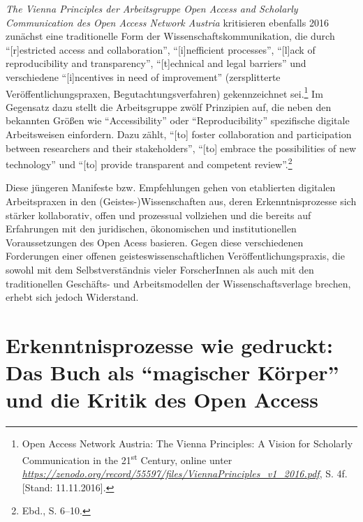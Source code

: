 \documentclass[a4paper,
fontsize=11pt,
oneside,
numbers=noperiodatend,
parskip=half-,
bibliography=totoc,
final
]{scrartcl}
\begin{document}
\emph{The Vienna Principles der Arbeitsgruppe Open Access and Scholarly
Communication des Open Access Network Austria} kritisieren ebenfalls
2016 zunächst eine traditionelle Form der Wissenschaftskommunikation,
die durch \enquote{{[}r{]}estricted access and collaboration},
\enquote{{[}i{]}nefficient processes}, \enquote{{[}l{]}ack of
reproducibility and transparency}, \enquote{{[}t{]}echnical and legal
barriers} und verschiedene \enquote{{[}i{]}n\-cent\-ives in need of
improvement} (zersplitterte Veröffentlichungspraxen,
Begutachtungsverfahren) gekennzeichnet sei.\footnote{Open Access Network
  Austria: The Vienna Principles: A Vision for Scholarly Communication
  in the 21\textsuperscript{st} Century, online unter
  \href{https://zenodo.org/record/55597/files/ViennaPrinciples_v1_2016.pdf}{\emph{https://zenodo.org/record/55597/files/ViennaPrinciples\_v1\_2016.pdf}},
  S. 4f. {[}Stand: 11.11.2016{]}.} Im Gegensatz dazu stellt die
Arbeitsgruppe zwölf Prinzipien auf, die neben den bekannten Größen wie
\enquote{Accessibility} oder \enquote{Reproducibility} spezifische
digitale Arbeitsweisen einfordern. Dazu zählt, \enquote{{[}to{]} foster
collaboration and participation between researchers and their
stakeholders}, \enquote{{[}to{]} embrace the possibilities of new
technology} und \enquote{{[}to{]} provide transparent and competent
review}.\footnote{Ebd., S. 6--10.}

Diese jüngeren Manifeste bzw. Empfehlungen gehen von etablierten
digitalen Arbeitspraxen in den (Geistes-)Wissenschaften aus, deren
Erkenntnisprozesse sich stärker kollaborativ, offen und prozessual
vollziehen und die bereits auf Erfahrungen mit den juridischen,
ökonomischen und institutionellen Voraussetzungen des Open Acess
basieren. Gegen diese verschiedenen Forderungen einer offenen
geisteswissenschaftlichen Veröffentlichungspraxis, die sowohl mit dem
Selbstverständnis vieler ForscherInnen als auch mit den traditionellen
Geschäfts- und Arbeitsmodellen der Wissenschaftsverlage brechen, erhebt
sich jedoch Widerstand.

\section*{\texorpdfstring{Erkenntnisprozesse wie gedruckt: Das Buch
als \enquote{magischer Körper} und die Kritik des Open
Access}{Erkenntnisprozesse wie gedruckt: Das Buch als magischer Körper und die Kritik des Open Access}}\label{erkenntnisprozesse-wie-gedruckt-das-buch-als-magischer-kuxf6rper-und-die-kritik-des-open-access}
\end{document}
